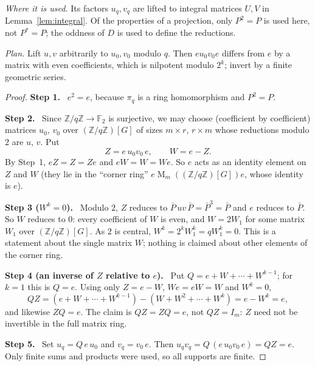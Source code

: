 \documentclass[11pt]{article}
\theoremstyle{remark}
\numberwithin{equation}{section}
\newcommand{\F}{\mathbb F}
\newcommand{\Z}{\mathbb Z}
\newcommand{\Mat}{\operatorname{M}}
\newcommand{\step}[1]{\par\smallskip\noindent\textbf{Step #1.}\ }
\begin{document}
\noindent\emph{Where it is used.} Its factors $u_q,v_q$ are lifted to integral matrices $U,V$ in Lemma~\ref{lem:integral}. Of the properties of a projection, only $P^2=P$ is used here, not $P^*=P$; the oddness of $D$ is used to define the reductions.

\noindent\emph{Plan.} Lift $u,v$ arbitrarily to $u_0,v_0$ modulo $q$. Then $eu_0v_0e$ differs from $e$ by a matrix with even coefficients, which is nilpotent modulo $2^k$; invert by a finite geometric series.

\begin{proof}
\step{1} $e^2=e$, because $\pi_q$ is a ring homomorphism and $P^2=P$.

\step{2} Since $\Z/q\Z\to\F_2$ is surjective, we may choose (coefficient by coefficient) matrices $u_0$, $v_0$ over $(\Z/q\Z)[G]$ of sizes $m\times r$, $r\times m$ whose reductions modulo $2$ are $u$, $v$. Put
\[
 Z=e\,u_0v_0\,e,\qquad W=e-Z .
\]
By Step~1, $eZ=Z=Ze$ and $eW=W=We$. So $e$ acts as an identity element on $Z$ and $W$ (they lie in the ``corner ring'' $e\Mat_m((\Z/q\Z)[G])e$, whose identity is $e$).

\step{3 ($W^k=0$)} Modulo $2$, $Z$ reduces to $\bar P\,uv\,\bar P=\bar P^3=\bar P$ and $e$ reduces to $\bar P$. So $W$ reduces to $0$: every coefficient of $W$ is even, and $W=2W_1$ for some matrix $W_1$ over $(\Z/q\Z)[G]$. As $2$ is central, $W^k=2^kW_1^k=qW_1^k=0$. This is a statement about the single matrix $W$; nothing is claimed about other elements of the corner ring.

\step{4 (an inverse of $Z$ relative to $e$)} Put $Q=e+W+\cdots+W^{k-1}$; for $k=1$ this is $Q=e$. Using only $Z=e-W$, $We=eW=W$ and $W^k=0$,
\[
 QZ=(e+W+\cdots+W^{k-1})-(W+W^2+\cdots+W^{k})=e-W^k=e,
\]
and likewise $ZQ=e$. The claim is $QZ=ZQ=e$, not $QZ=I_m$: $Z$ need not be invertible in the full matrix ring.

\step{5} Set $u_q=Q\,e\,u_0$ and $v_q=v_0\,e$. Then $u_qv_q=Q\,(e\,u_0v_0\,e)=QZ=e$. Only finite sums and products were used, so all supports are finite.
\end{proof}
\end{document}
